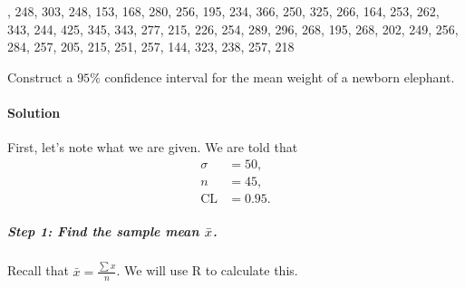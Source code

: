 \documentclass[letterpaper,10pt,english]{jupyterBook}
\begin{document}
, 248, 303, 248, 153, 168, 280, 256, 195, 234, 366, 250, 325, 266, 164, 253, 262, 343, 244, 425, 345, 343, 277, 215, 226, 254, 289, 296, 268, 195, 268, 202, 249, 256, 284, 257, 205, 215, 251, 257, 144, 323, 238, 257, 218

\sphinxAtStartPar
Construct a \(95\%\) confidence interval for the mean weight of a newborn elephant.


\paragraph{Solution}
\label{\detokenize{Ch5 Confidence Intervals/5.1 Estimating Population Means (Sigma Known):id1}}
\sphinxAtStartPar
First, let’s note what we are given. We are told that
\begin{align*}
\sigma &= 50, \\
n &= 45, \\
\text{CL} &= 0.95.
\end{align*}

\subparagraph{Step 1: Find the sample mean \protect\(\bar{x}\protect\).}
\label{\detokenize{Ch5 Confidence Intervals/5.1 Estimating Population Means (Sigma Known):step-1-find-the-sample-mean-bar-x}}
\sphinxAtStartPar
Recall that \(\bar{x} = \frac{\sum x}{n}\). We will use R to calculate this.
\end{document}
